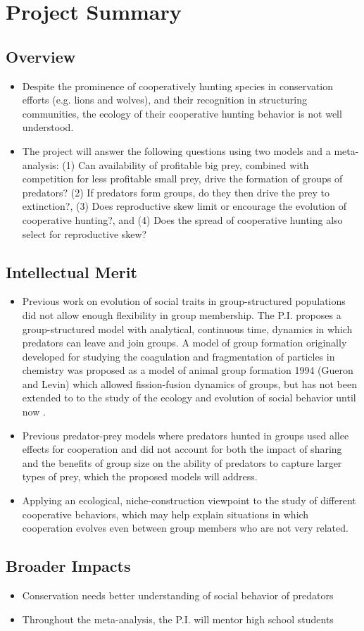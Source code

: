 
\section{Project Summary}
\subsection{Overview}
\begin{itemize} 
\item Despite the prominence of cooperatively hunting species in conservation efforts (e.g. lions and wolves), and their recognition in structuring communities, the ecology of their cooperative hunting behavior is not well understood.
\item The project will answer the following questions using two models and a meta-analysis: (1) Can availability of profitable big prey, combined with competition for less profitable small prey, drive the formation of groups of predators? (2) If predators form groups, do they then drive the prey to extinction?, (3) Does reproductive skew limit or encourage the evolution of cooperative hunting?, and (4) Does the spread of cooperative hunting also select for reproductive skew?
\end{itemize}
\subsection{Intellectual Merit}
\begin{itemize}
\item Previous work on evolution of social traits in group-structured populations did not allow enough flexibility in group membership. The P.I. proposes a group-structured model with analytical, continuous time, dynamics in which predators can leave and join groups.  A model of group formation originally developed for studying the coagulation and fragmentation of particles in chemistry was proposed as a model of animal group formation 1994 (Gueron and Levin) which allowed fission-fusion dynamics of groups, but has not been extended to to the study of the ecology and evolution of social behavior until now . 
\item Previous predator-prey models where predators hunted in groups used allee effects for cooperation and did not account for both the impact of sharing and the benefits of group size on the ability of predators to capture larger types of prey, which the proposed models will address.
\item Applying an ecological, niche-construction viewpoint to the study of different cooperative behaviors, which may help explain situations in which cooperation evolves even between group members who are not very related.
\end{itemize}

\subsection{Broader Impacts}
\begin{itemize}
\item Conservation needs better understanding of social behavior of predators
\item Throughout the meta-analysis, the P.I. will mentor high school students
\end{itemize}
